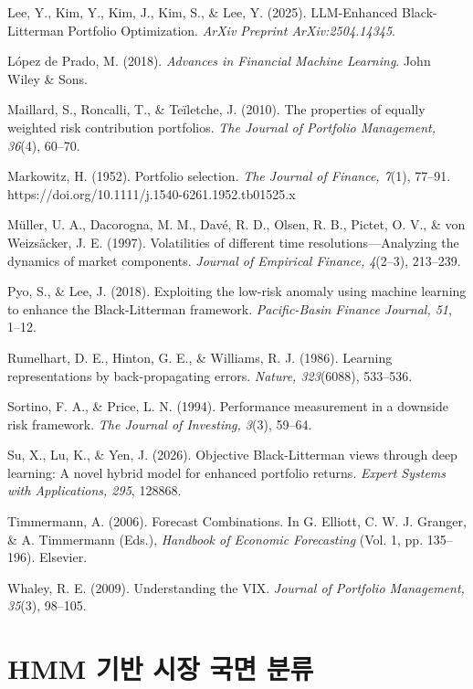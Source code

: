 \documentclass{article}
\begin{document}
Lee, Y., Kim, Y., Kim, J., Kim, S., & Lee, Y. (2025). LLM-Enhanced Black-Litterman Portfolio Optimization. \textit{ArXiv Preprint ArXiv:2504.14345}.

López de Prado, M. (2018). \textit{Advances in Financial Machine Learning}. John Wiley & Sons.

Maillard, S., Roncalli, T., & Te\"iletche, J. (2010). The properties of equally weighted risk contribution portfolios. \textit{The Journal of Portfolio Management, 36}(4), 60–70.

Markowitz, H. (1952). Portfolio selection. \textit{The Journal of Finance, 7}(1), 77–91. https://doi.org/10.1111/j.1540-6261.1952.tb01525.x

Müller, U. A., Dacorogna, M. M., Davé, R. D., Olsen, R. B., Pictet, O. V., & von Weizsäcker, J. E. (1997). Volatilities of different time resolutions—Analyzing the dynamics of market components. \textit{Journal of Empirical Finance, 4}(2–3), 213–239.

Pyo, S., & Lee, J. (2018). Exploiting the low-risk anomaly using machine learning to enhance the Black-Litterman framework. \textit{Pacific-Basin Finance Journal, 51}, 1–12.

Rumelhart, D. E., Hinton, G. E., & Williams, R. J. (1986). Learning representations by back-propagating errors. \textit{Nature, 323}(6088), 533–536.

Sortino, F. A., & Price, L. N. (1994). Performance measurement in a downside risk framework. \textit{The Journal of Investing, 3}(3), 59–64.

Su, X., Lu, K., & Yen, J. (2026). Objective Black-Litterman views through deep learning: A novel hybrid model for enhanced portfolio returns. \textit{Expert Systems with Applications, 295}, 128868.

Timmermann, A. (2006). Forecast Combinations. In G. Elliott, C. W. J. Granger, & A. Timmermann (Eds.), \textit{Handbook of Economic Forecasting} (Vol. 1, pp. 135–196). Elsevier.

Whaley, R. E. (2009). Understanding the VIX. \textit{Journal of Portfolio Management, 35}(3), 98–105.


\appendix
\renewcommand{\thesection}{부록 \Alph{section}}
\renewcommand{\thefigure}{A.\arabic{figure}}
\renewcommand{\thetable}{A.\arabic{table}}
\setcounter{figure}{0}
\setcounter{table}{0}

\section{HMM 기반 시장 국면 분류}\label{app:hmm}
\end{document}
